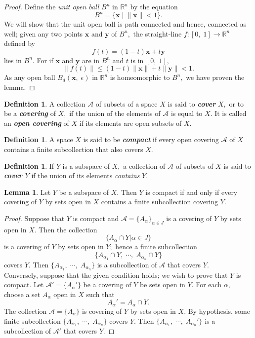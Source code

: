 \documentclass{article}
\theoremstyle{definition}
\newtheorem{lem}[theorem]{Lemma}
\newtheorem{defn}[theorem]{Definition}
\begin{document}
\begin{proof}
  Define the \emph{unit open ball} $B^n$ in $\mathbb{R}^n$ by the equation
  \[B^{n}=\{\mathbf{x} \;|\;\|\mathbf{x}\| < 1\}.\]
  We will show that the unit open ball is path connected and hence, connected as well; given any two points $\textbf{x}$ and $\textbf{y}$ of $B^n,$ the straight-line $f:[0,\;1] \longrightarrow \mathbb{R}^n$ defined by
  \[f(t) = (1-t)\textbf{x} + t\textbf{y}\]
  lies in $B^n.$ For if $\textbf{x}$ and $\textbf{y}$ are in $B^n$ and $t$ is in $[0,\;1],$
  \[\|f(t)\| \le (1-t)\|\textbf{x}\| + t\|\textbf{y}\| < 1.\]
  As any open ball $B_d(\textbf{x},\;\epsilon)$ in $\mathbb{R}^n$ is homeomorphic to $B^n,$ we have proven the lemma.
\end{proof}
\begin{defn}
  A collection $\mathcal{A}$ of subsets of a space $X$ is said to \textbf{\emph{cover}} $X,$ or to be a \textbf{\emph{covering}} of $X,$ if the union of the elements of $\mathcal{A}$ is equal to $X.$ It is called an \textbf{\emph{open covering}} of $X$ if its elements are open subsets of $X.$
\end{defn}
%
\begin{defn}
  A space $X$ is said to be \textbf{\emph{compact}} if every open covering $\mathcal{A}$ of $X$ contains a finite subcollection that also covers $X.$
\end{defn}
%
\begin{defn}
  If $Y$ is a subspace of $X,$ a collection of $\mathcal{A}$ of subsets of $X$ is said to \textbf{\emph{cover $Y$}} if the union of its elements \emph{contains} $Y.$
\end{defn}
\begin{lem}
  Let $Y$ be a subspace of $X.$ Then $Y$ is compact if and only if every covering of $Y$ by sets open in $X$ contains a finite subcollection covering $Y.$
\end{lem}
\begin{proof}
  Suppose that $Y$ is compact and $\mathcal{A} = \{A_\alpha\}_{\alpha\in J}$ is a covering of $Y$ by sets open in $X.$ Then the collection
  \[\{A_\alpha \cap Y | \alpha \in J\}\]
  is a covering of $Y$ by sets open in $Y;$ hence a finite subcollection
  \[\{A_{\alpha_1} \cap Y,\;\cdots,\; A_{\alpha_n}\cap Y\}\]
  covers $Y.$ Then $\{A_{\alpha_1},\;\cdots,\;A_{\alpha_n}\}$ is a subcollection of $\mathcal{A}$ that covers $Y.$\\
  Conversely, suppose that the given condition holds; we wish to prove that $Y$ is compact. Let $\mathcal{A}' = \{A_\alpha'\}$ be a covering of $Y$ be sets open in $Y.$ For each $\alpha,$ choose a set $A_\alpha$ open in $X$ such that
  \[A_\alpha' = A_\alpha \cap Y.\]
  The collection $\mathcal{A} = \{A_\alpha\}$ is covering of $Y$ by sets open in $X.$ By hypothesis, some finite subcollection $\{A_{\alpha_1},\;\cdots,\;A_{\alpha_n}\}$ covers $Y.$ Then $\{A_{\alpha_1},\;\cdots,\;A_{\alpha_{n}}'\}$ is a subcollection of $\mathcal{A}'$ that covers $Y.$
\end{proof}
\end{document}

